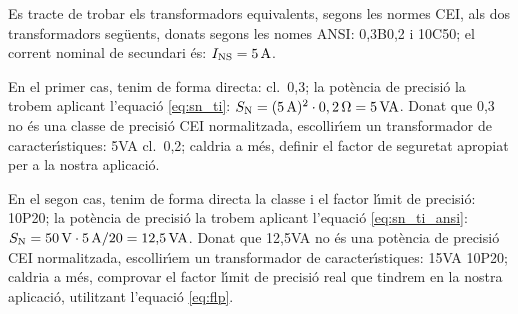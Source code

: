 \begin{exemple}
    Es tracte de trobar els transformadors equivalents, segons les normes \textsf{CEI}, als dos
    transformadors seg\"{u}ents, donats segons les nomes \textsf{ANSI}: 0,3B0,2 i
    10C50; el corrent nominal de secundari \'{e}s:    $I_\mathrm{NS}=5\mathrm{\,A}$.

    En el primer cas, tenim de forma directa: cl.~0,3; la pot\`{e}ncia de precisi\'{o} la trobem
    aplicant l'equaci\'{o} \eqref{eq:sn_ti}: $S_\mathrm{N} =(5\mathrm{\,A})^2 \cdot 0,2\mathrm{\,\mathrm{\Omega}} =
    5\mathrm{\,VA}$.
    Donat que 0,3 no \'{e}s una classe de precisi\'{o} \textsf{CEI} normalitzada,
    escollir\'{\i}em un transformador de caracter\'{\i}stiques:
    5\unit{VA} cl.~0,2; caldria a m\'{e}s, definir el factor de
    seguretat apropiat per a la nostra aplicaci\'{o}.

    En el segon cas, tenim de forma directa la classe i el factor l\'{\i}mit de
    precisi\'{o}: 10P20; la pot\`{e}ncia de precisi\'{o} la trobem
    aplicant l'equaci\'{o} \eqref{eq:sn_ti_ansi}: $S_\mathrm{N} = 50\mathrm{\,V} \cdot
    5\mathrm{\,A} / 20 = 12{,}5\mathrm{\,VA}$.
    Donat que 12,5\unit{VA} no \'{e}s una pot\`{e}ncia de precisi\'{o} \textsf{CEI} normalitzada,
     escollir\'{\i}em un transformador de caracter\'{\i}stiques:
    15\unit{VA} 10P20; caldria a m\'{e}s, comprovar el factor l\'{\i}mit de precisi\'{o} real
    que tindrem en la nostra aplicaci\'{o}, utilitzant l'equaci\'{o} \eqref{eq:flp}.

\end{exemple}
